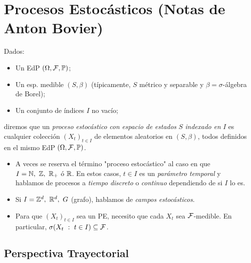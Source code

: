 \chapter{Procesos Estocásticos (Notas de Anton Bovier)}


\begin{definition}
Dados:
	\begin{itemize}
		\item Un EdP $(\Omega, \mathcal{F}, \mathbb{P})$;

		\item Un esp. medible $(S, \beta)$ (típicamente, $S$ métrico y separable y $\beta = \sigma$-álgebra de Borel);

		\item Un conjunto de índices $I$ no vacío;
	\end{itemize}
	diremos que un \textit{proceso estocástico con espacio de estados} $S$ \textit{indexado en} $I$ es cualquier colección $(X_{t})_{t \in I}$ de elementos aleatorios en $(S, \beta)$, todos definidos en el mismo EdP $(\Omega, \mathcal{F}, \mathbb{P})$.
\end{definition}

\begin{note}
	\begin{itemize}
		\item A veces se reserva el término "proceso estocástico" al caso en que $I = \mathbb{N},\ \mathbb{Z},\ \mathbb{R}_{+}$ ó $\mathbb{R}$. En estos casos, $t \in I$ es un \textit{parámetro temporal} y hablamos de procesos a \textit{tiempo discreto} o \textit{continuo} dependiendo de si $I$ lo es.

		\item Si $I = \mathbb{Z}^{d},\ \mathbb{R}^{d},\ G$ (grafo), hablamos de \textit{campos estocásticos}.

		\item Para que $(X_{t})_{t \in I}$ sea un PE, necesito que cada $X_{t}$ sea $\mathcal{F}$-medible. En particular, $\sigma(X_{t} \ : \ t \in I) \subseteq \mathcal{F}$.
	\end{itemize}
\end{note}

\section{Perspectiva Trayectorial}

